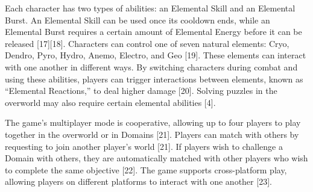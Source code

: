{Each character has two types of abilities: an Elemental Skill and an Elemental Burst. An Elemental Skill can be used once its cooldown ends, while an Elemental Burst requires a certain amount of Elemental Energy before it can be released [17][18]. Characters can control one of seven natural elements: Cryo, Dendro, Pyro, Hydro, Anemo, Electro, and Geo [19]. These elements can interact with one another in different ways. By switching characters during combat and using these abilities, players can trigger interactions between elements, known as “Elemental Reactions,” to deal higher damage [20]. Solving puzzles in the overworld may also require certain elemental abilities [4].

The game’s multiplayer mode is cooperative, allowing up to four players to play together in the overworld or in Domains [21]. Players can match with others by requesting to join another player’s world [21]. If players wish to challenge a Domain with others, they are automatically matched with other players who wish to complete the same objective [22]. The game supports cross-platform play, allowing players on different platforms to interact with one another [23].

}

 

\makeenabstract

